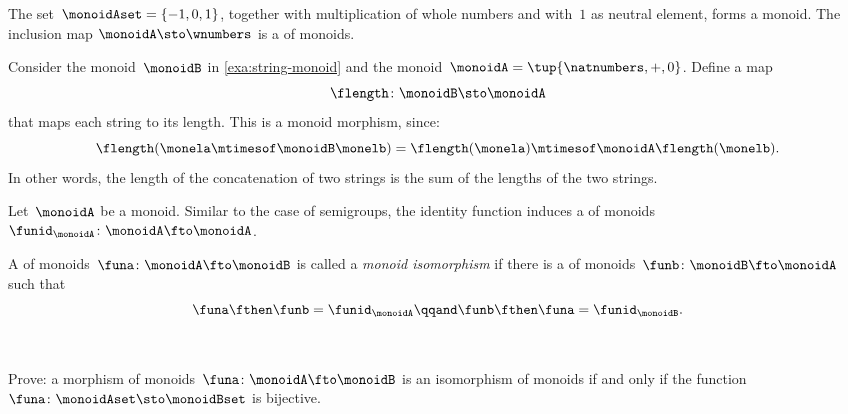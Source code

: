 \begin{example}
	The set~$\monoidAset = \{ -1, 0, 1 \}$, together with multiplication of whole numbers and with~$1$ as neutral element, forms a monoid.
	The inclusion map $\monoidA \sto \wnumbers$ is a \whomo of monoids.
\end{example}

\begin{example}
	\label{exa:string-length}
	Consider the monoid~$\monoidB$ in \cref{exa:string-monoid} and the monoid~$\monoidA=\tup{\natnumbers, +,0}$.
	Define a map
	\begin{equation*}
		\flength \colon \monoidB \sto \monoidA
	\end{equation*}
	that maps each string to its length.
	This is a monoid morphism, since:
	\begin{equation*}
		\flength(\monela \mtimesof\monoidB \monelb)=\flength(\monela)\mtimesof\monoidA \flength(\monelb).
	\end{equation*}
	In other words, the length of the concatenation of two strings is the sum of the lengths of the two strings.
\end{example}

\begin{ctdefinition}
	\label{def:identity-mon-mor}
	Let~$\monoidA$ be a monoid.
	Similar to the case of semigroups, the identity function induces a \whomo of monoids~$\funid_\monoidA\colon \monoidA \fto \monoidA$.
\end{ctdefinition}

\begin{ctdefinition}
	\label{def:monoid-iso}
	A \whomo of monoids~$\funa\colon \monoidA \fto \monoidB$ is called a \emph{monoid isomorphism} if there is a \whomo of monoids~$\funb\colon \monoidB \fto \monoidA$ such that
	\begin{equation}
		\funa \fthen \funb = \funid_\monoidA \qqand \funb \fthen \funa = \funid_\monoidB.
	\end{equation}
\end{ctdefinition}

\clearpage

~

\vfill%

\begin{gradedexercise}
	Prove: a morphism of monoids~$\funa\colon \monoidA \fto \monoidB$ is an isomorphism of monoids if and only if the function~$\funa\colon \monoidAset \sto \monoidBset$ is bijective.
\end{gradedexercise}

